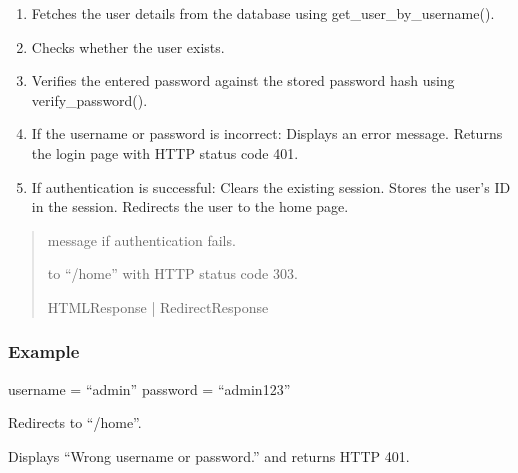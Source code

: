 \documentclass[letterpaper,10pt,english]{sphinxmanual}
\begin{document}
\begin{fulllineitems}
\begin{description}
\begin{enumerate}
\item {} 
\sphinxAtStartPar
Fetches the user details from the database using
get\_user\_by\_username().

\item {} 
\sphinxAtStartPar
Checks whether the user exists.

\item {} 
\sphinxAtStartPar
Verifies the entered password against the stored
password hash using verify\_password().

\item {} 
\sphinxAtStartPar
If the username or password is incorrect:
\sphinxhyphen{} Displays an error message.
\sphinxhyphen{} Returns the login page with HTTP status code 401.

\item {} 
\sphinxAtStartPar
If authentication is successful:
\sphinxhyphen{} Clears the existing session.
\sphinxhyphen{} Stores the user’s ID in the session.
\sphinxhyphen{} Redirects the user to the home page.

\end{enumerate}

\end{description}
\begin{quote}\begin{description}
\sphinxAtStartPar
\begin{description}
\sphinxAtStartPar
message if authentication fails.

\sphinxAtStartPar
to “/home” with HTTP status code 303.

\end{description}


\sphinxAtStartPar
HTMLResponse | RedirectResponse

\end{description}\end{quote}
\subsubsection*{Example}
\begin{description}
\sphinxAtStartPar
username = “admin”
password = “admin123”

\sphinxAtStartPar
Redirects to “/home”.

\sphinxAtStartPar
Displays “Wrong username or password.”
and returns HTTP 401.

\end{description}

\end{fulllineitems}
\end{document}
